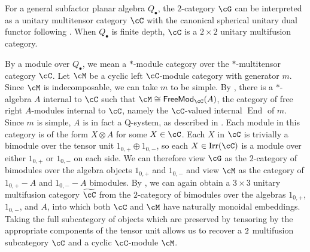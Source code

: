 \documentclass[11pt]{article}
\theoremstyle{plain}
\theoremstyle{definition}
\DeclareMathOperator{\End}{End}
\DeclareMathOperator{\Irr}{Irr}
\newcommand{\FreeMod}{{\sf FreeMod}}
\begin{document}
For a general subfactor planar algebra $Q_{\bullet}$, the $2$-category $\cG$ can be interpreted as a unitary multitensor category $\cC$ with the canonical spherical unitary dual functor following \cite{egno,UnitaryDualFunctors}. 
When $Q_{\bullet}$ is finite depth, $\cC$ is a $2\times 2$ unitary multifusion category. 

By a module over $Q_\bullet$, we mean a $\ast$-module category over the $\ast$-multitensor category $\cC$. Let $\cM$ be a cyclic left $\cC$-module category with generator $m$. 
Since $\cM$ is indecomposable, we can take $m$ to be simple. 
By \cite{ostrik03}, there is a $\ast$-algebra $A$ internal to $\cC$ such that $\cM\cong\FreeMod_\cC(A)$, the category of free right $A$-modules internal to $\cC$, namely the $\cC$-valued internal $\End$ of $m$. 
Since $m$ is simple, 
$A$ is in fact a Q-system, %
as described in \cite[Rmk.2.7]{ny17}.  
Each module in this category is of the form $X\otimes A$ for some $X\in\cC$. 
Each $X$ in $\cC$ is trivially a bimodule over the tensor unit $1_{0,+}\oplus1_{0,-}$, so each $X\in\Irr(\cC)$ is a module over either $1_{0,+}$ or $1_{0,-}$ on each side. 
We can therefore view $\cG$ as the $2$-category of bimodules over the algebra objects $1_{0,+}$ and $1_{0,-}$ and view $\cM$ as the category of $1_{0,+}-A$ and $1_{0,-}-A$ bimodules. 
By \cite[Thm.4.1]{ny17}, we can again obtain a $3\times 3$ unitary multifusion category $\widetilde{\cC}$ from the $2$-category of bimodules over the algebras $1_{0,+}$, $1_{0,-}$, and $A$, into which both $\cC$ and $\cM$ have naturally monoidal embeddings. 
Taking the full subcategory of objects which are preserved by tensoring by the appropriate components of the tensor unit allows us to recover a $2\time 2$ multifusion subcategory $\cC$ and a cyclic $\cC$-module $\cM$. 



\end{document}
